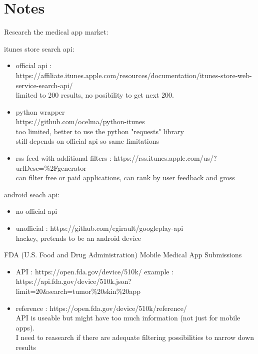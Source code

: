 \section{Notes}

Research the medical app market:

\noindent
itunes store search api:

\begin{itemize}
\item official api :
\\ https://affiliate.itunes.apple.com/resources/documentation/itunes-store-web-service-search-api/
\\ limited to 200 results, no posibility to get next 200.
\item python wrapper
\\ https://github.com/ocelma/python-itunes
\\ too limited, better to use the python "requests" library
\\ still depends on official api so same limitations
\item rss feed with additional filters : https://rss.itunes.apple.com/us/?urlDesc=\%2Fgenerator
\\ can filter free or paid applications, can rank by user feedback and gross

\end{itemize}

\noindent
android seach api:
\begin{itemize}
\item no official api
\item unofficial : https://github.com/egirault/googleplay-api
\\ hackey, pretends to be an android device
\end{itemize}

\noindent
FDA (U.S. Food and Drug Administration) Mobile Medical App Submissions
\begin{itemize}
\item API : https://open.fda.gov/device/510k/ example : https://api.fda.gov/device/510k.json?limit=20\&search=tumor\%20skin\%20app
\item reference : https://open.fda.gov/device/510k/reference/
\\ API is useable but might have too much information (not just for mobile apps).
\\ I need to reasearch if there are adequate filtering possibilities to narrow down results
\end{itemize}